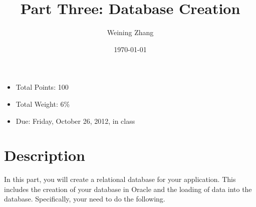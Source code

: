 \documentclass[11pt]{article}
\title{Part Three: Database Creation}
\author{Weining Zhang}
\date{\today}
\begin{document}
\maketitle


\begin{itemize}
\item Total Points: 100
\item Total Weight: 6\%
\item Due: Friday, October 26, 2012, in class
\end{itemize}

\section*{Description}
\label{sec-1}


  In this part, you will create a relational database for your
  application. This includes the creation of your database in Oracle
  and the loading of data into the database. Specifically, your need
  to do the following.
\end{document}
